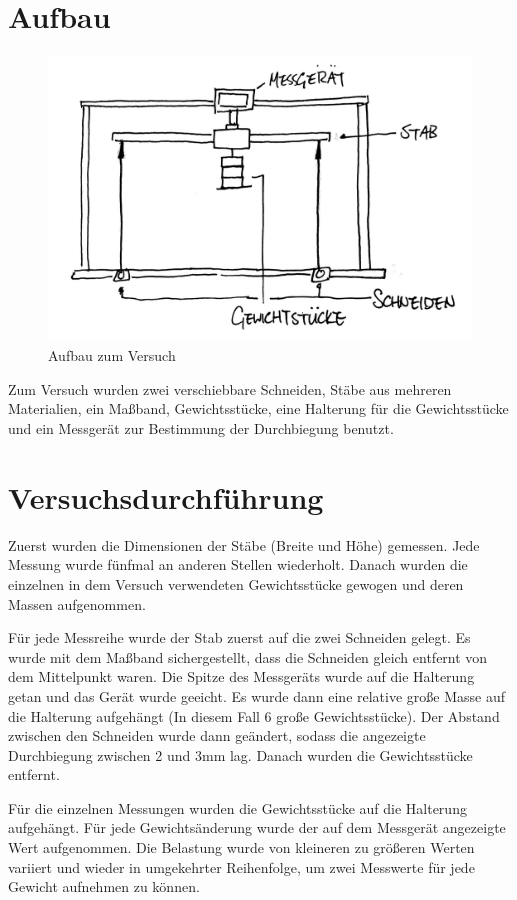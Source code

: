 \documentclass[11pt,a4paper]{article}
\begin{document}
\section{Aufbau}
\begin{figure}[h]
	\centering
	\includegraphics[width=\linewidth]{Abb1}
	\caption{Aufbau zum Versuch}
\end{figure}
Zum Versuch wurden zwei verschiebbare Schneiden, Stäbe aus mehreren Materialien, ein Maßband, Gewichtsstücke, eine Halterung für die Gewichtsstücke und ein Messgerät zur Bestimmung der Durchbiegung benutzt. 


\section{Versuchsdurchführung}
Zuerst wurden die Dimensionen der Stäbe (Breite und Höhe) gemessen. Jede Messung wurde fünfmal an anderen Stellen wiederholt. Danach wurden die einzelnen in dem Versuch verwendeten Gewichtsstücke gewogen und deren Massen aufgenommen. 

Für jede Messreihe wurde der Stab zuerst auf die zwei Schneiden gelegt. Es wurde mit dem Maßband sichergestellt, dass die Schneiden gleich entfernt von dem Mittelpunkt waren. Die Spitze des Messgeräts wurde auf die Halterung getan und das Gerät wurde geeicht. Es wurde dann eine relative große Masse auf die Halterung aufgehängt (In diesem Fall 6 große Gewichtsstücke). Der Abstand zwischen den Schneiden wurde dann geändert, sodass die angezeigte Durchbiegung zwischen 2 und 3mm lag. Danach wurden die Gewichtsstücke entfernt. 

Für die einzelnen Messungen wurden die Gewichtsstücke auf die Halterung aufgehängt. Für jede Gewichtsänderung wurde der auf dem Messgerät angezeigte Wert aufgenommen. Die Belastung wurde von kleineren zu größeren Werten variiert und wieder in umgekehrter Reihenfolge, um zwei Messwerte für jede Gewicht aufnehmen zu können. 
\end{document}
